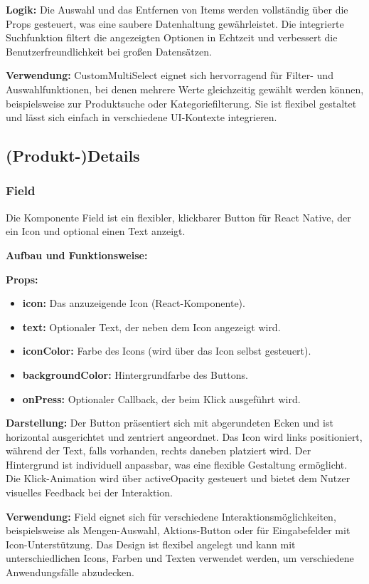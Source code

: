 \documentclass[12pt, a4paper]{report} %
\begin{document}
\textbf{Logik:}
Die Auswahl und das Entfernen von Items werden vollständig über die Props gesteuert, was eine saubere Datenhaltung gewährleistet. Die integrierte Suchfunktion filtert die angezeigten Optionen in Echtzeit und verbessert die Benutzerfreundlichkeit bei großen Datensätzen.

\noindent\textbf{Verwendung:} CustomMultiSelect eignet sich hervorragend für Filter- und Auswahlfunktionen, bei denen mehrere Werte gleichzeitig gewählt werden können, beispielsweise zur Produktsuche oder Kategoriefilterung. Sie ist flexibel gestaltet und lässt sich einfach in verschiedene UI-Kontexte integrieren.

\subsection{(Produkt-)Details}

\subsubsection{Field}
Die Komponente Field ist ein flexibler, klickbarer Button für React Native, der ein Icon und optional einen Text anzeigt.

\noindent\textbf{Aufbau und Funktionsweise:}

\textbf{Props:}
\begin{itemize}
    \item \textbf{icon:} Das anzuzeigende Icon (React-Komponente).
    \item \textbf{text:} Optionaler Text, der neben dem Icon angezeigt wird.
    \item \textbf{iconColor:} Farbe des Icons (wird über das Icon selbst gesteuert).
    \item \textbf{backgroundColor:} Hintergrundfarbe des Buttons.
    \item \textbf{onPress:} Optionaler Callback, der beim Klick ausgeführt wird.
\end{itemize}

\textbf{Darstellung:}
Der Button präsentiert sich mit abgerundeten Ecken und ist horizontal ausgerichtet und zentriert angeordnet. Das Icon wird links positioniert, während der Text, falls vorhanden, rechts daneben platziert wird. Der Hintergrund ist individuell anpassbar, was eine flexible Gestaltung ermöglicht. Die Klick-Animation wird über activeOpacity gesteuert und bietet dem Nutzer visuelles Feedback bei der Interaktion.

\noindent\textbf{Verwendung:} Field eignet sich für verschiedene Interaktionsmöglichkeiten, beispielsweise als Mengen-Auswahl, Aktions-Button oder für Eingabefelder mit Icon-Unterstützung. Das Design ist flexibel angelegt und kann mit unterschiedlichen Icons, Farben und Texten verwendet werden, um verschiedene Anwendungsfälle abzudecken.
\end{document}
